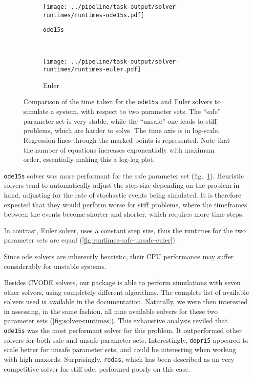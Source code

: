 \begin{figure}[tb]
   \centering
   \begin{subfigure}[t]{0.45\textwidth}
       \texttt{[image: ../pipeline/task-output/solver-runtimes/runtimes-ode15s.pdf]}
       \caption{\texttt{ode15s}}
       \label{fig:runtimes-safe-unsafe-ode15s}
   \end{subfigure}
   ~
   \begin{subfigure}[t]{0.45\textwidth}
       \texttt{[image: ../pipeline/task-output/solver-runtimes/runtimes-euler.pdf]}
       \caption{Euler}
       \label{fig:runtimes-safe-unsafe-euler}
   \end{subfigure}
   
    \caption{Comparison of the time taken for the {\tt ode15s} and Euler solvers to simulate a system, with respect to two parameter sets.
     The ``safe'' parameter set is very stable, while the ``unsafe'' one leads to stiff problems, which are harder to solve.
    The time axis is in log-scale. Regression lines through the marked points is represented.
    Note that the number of equations increases exponentially with maximum order, essentially making this a log-log plot.}
\label{fig:runtimes-safe-unsafe}
\end{figure}

\texttt{ode15s} solver was more performant for the safe parameter set (fig.~\ref{fig:runtimes-safe-unsafe-ode15s}).
Heuristic solvers tend to automatically adjust the step size depending on the problem in hand, adjusting for the rate of stochastic events being simulated.
It is therefore expected that they would perform worse for stiff problems, where the timeframes between the events become shorter and shorter, which requires more time steps.

In contrast, Euler solver, uses a constant step size, thus the runtimes for the two parameter sets are equal (\autoref{fig:runtimes-safe-unsafe-euler}).

Since \gls{ode} solvers are inherently heuristic, their CPU performance may suffer considerably for unstable systems.

Besides CVODE solvers, our package is able to perform simulations with seven other solvers, using completely different algorithms.
The complete list of available solvers used is available in the documentation.
Naturally, we were then interested in assessing, in the same fashion, all nine available solvers for these two parameter sets (\autoref{fig:solver-runtimes}).
This exhaustive analysis reviled that \texttt{ode15s} was the most performant solver for this problem.
It outperformed other solvers for both safe and unsafe parameter sets.
Interestingly, \texttt{dopri5} appeared to scale better for unsafe parameter sets, and could be interesting when working with high \gls{maxord}s.
Surprisingly, \texttt{rodas}, which has been described as an very competitive solver for stiff \gls{ode}\cite{sandu_benchmarking_1997},
performed poorly on this case.

